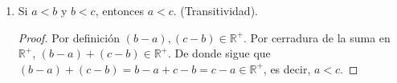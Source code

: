 \documentclass[11pt]{article}
\newcommand{\R}{\mathbb{R}}
\begin{document}
\begin{enumerate}[label=\alph*)]
%
 \item Si $a<b$ y $b<c$, entonces $a<c$. (Transitividad).
 \begin{proof} 
  Por definición $(b-a) , (c-b) \in \R^+$. Por cerradura de la suma en $\R^+$, $(b-a) + (c-b) \in \R^+$. De donde sigue que $(b-a)+(c-b)=b-a+c-b=c-a\in \R^+$, es decir, $a<c$.
 \end{proof}


\end{enumerate}
\end{document}
